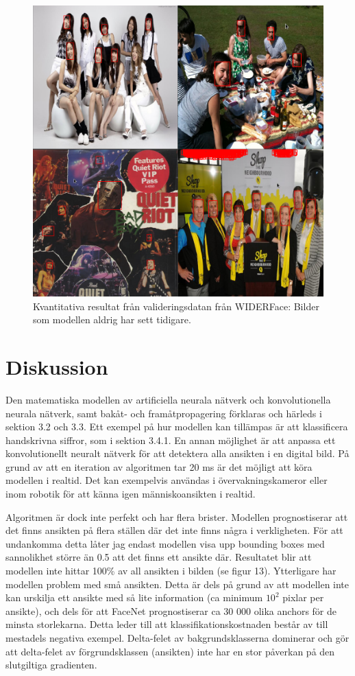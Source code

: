 \documentclass[a4paper,11pt,twoside]{article}
\begin{document}
\begin{figure}[h]\label{results1}
	\centering
  		\includegraphics[scale=0.42]{results1.png}
  	\caption{Kvantitativa resultat från valideringsdatan från WIDERFace: Bilder som modellen aldrig har sett tidigare.}
\end{figure}

\section{Diskussion}
Den matematiska modellen av artificiella neurala nätverk och konvolutionella neurala nätverk, samt bakåt- och framåtpropagering förklaras och härleds i sektion 3.2 och 3.3. Ett exempel på hur modellen kan tillämpas är att klassificera handskrivna siffror, som i sektion 3.4.1. 
En annan möjlighet är att anpassa ett konvolutionellt neuralt nätverk för att detektera alla ansikten i en digital bild. På grund av att en iteration av algoritmen tar 20 ms är det möjligt att köra modellen i realtid. Det kan exempelvis användas i övervakningskameror eller inom robotik för att känna igen människoansikten i realtid. 

Algoritmen är dock inte perfekt och har flera brister. Modellen prognostiserar att det finns ansikten på flera ställen där det inte finns några i verkligheten. För att undankomma detta låter jag endast modellen visa upp bounding boxes med sannolikhet större än 0.5 att det finns ett ansikte där. Resultatet blir att modellen inte hittar 100\% av all ansikten i bilden (se figur 13). Ytterligare har modellen problem med små ansikten. Detta är dels på grund av att modellen inte kan urskilja ett ansikte med så lite information (ca minimum $10^2$ pixlar per ansikte), och dels för att FaceNet prognostiserar ca 30 000 olika anchors för de minsta storlekarna. Detta leder till att klassifikationskostnaden består av till mestadels negativa exempel. Delta-felet av bakgrundsklasserna dominerar och gör att delta-felet av förgrundsklassen (ansikten) inte har en stor påverkan på den slutgiltiga gradienten.
\end{document}
